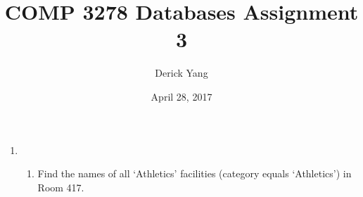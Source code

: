 \documentclass[12pt]{article}
\title{COMP 3278 Databases Assignment 3}
\date{April 28, 2017}
\author{Derick Yang}
\begin{document}
\maketitle
\begin{enumerate}
	\item \begin{enumerate}
	\item Find the names of all `Athletics' facilities (category equals `Athletics') in Room 417.
	\end{enumerate}
\end{enumerate}
\end{document}
